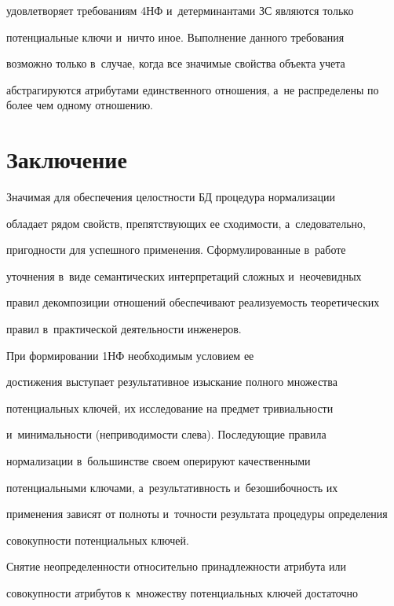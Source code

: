 удовлетворяет требованиям 4НФ и~детерминантами ЗС являются только 

потенциальные ключи и~ничто иное. Выполнение данного требования 

возможно только в~случае, когда все значимые свойства объекта учета 

абстрагируются атрибутами единственного отношения, а~не распределены по более чем одному отношению.







\section{Заключение}



  Значимая для обеспечения це\-лост\-ности БД процедура нормализации 

обладает рядом свойств, препятствующих ее схо\-ди\-мости, а~следовательно, 

пригодности для успешного применения. Сформулированные в~работе 

уточнения в~виде семантических интерпретаций слож\-ных и~неочевидных 

правил декомпозиции отношений обеспечивают ре\-а\-ли\-зу\-емость тео\-ре\-ти\-че\-ских 

правил в~практической дея\-тель\-ности инженеров.

  

  При формировании 1НФ необходимым условием ее 

достижения выступает результативное изыскание полного множества 

потенциальных ключей, их исследование на предмет три\-ви\-аль\-ности 

и~ми\-ни\-маль\-ности (неприводимости слева). Последующие правила 

нормализации в~большинстве своем оперируют качественными 

потенциальными ключами, а~результативность и~безоши\-боч\-ность их 

применения зависят от пол\-но\-ты и~точ\-ности результата процедуры определения 

со\-во\-куп\-ности потенциальных ключей.

  

  Снятие неопределенности относительно принадлежности атрибута или 

со\-во\-куп\-ности атрибутов к~множеству потенциальных ключей достаточно 


